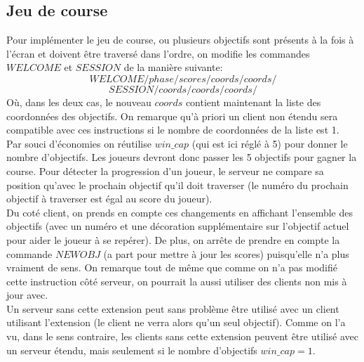 \documentclass{article}
\begin{document}
\subsection{Jeu de course}
Pour implémenter le jeu de course, ou plusieurs objectifs sont présents à la fois à l'écran et doivent être traversé dans l'ordre, on modifie les commandes $WELCOME$ et $SESSION$ de la manière suivante:
$$WELCOME/phase/scores/coords/coords/$$
$$SESSION/coords/coords/coords/$$
Où, dans les deux cas, le nouveau $coords$ contient maintenant la liste des coordonnées des objectifs. On remarque qu'à priori un client non étendu sera compatible avec ces instructions si le nombre de coordonnées de la liste est 1.\\
Par souci d'économies on réutilise $win\_cap$ (qui est ici réglé à 5) pour donner le nombre d'objectifs. Les joueurs devront donc passer les 5 objectifs pour gagner la course. Pour détecter la progression d'un joueur, le serveur ne compare sa position qu'avec le prochain objectif qu'il doit traverser (le numéro du prochain objectif à traverser est égal au score du joueur).\\
Du coté client, on prends en compte ces changements en affichant l'ensemble des objectifs (avec un numéro et une décoration supplémentaire sur l'objectif actuel pour aider le joueur à se repérer). De plus, on arrête de prendre en compte la commande $NEWOBJ$ (a part pour mettre à jour les scores) puisqu'elle n'a plus vraiment de sens. On remarque tout de même que comme on n'a pas modifié cette instruction côté serveur, on pourrait la aussi utiliser des clients non mis à jour avec.\\
Un serveur sans cette extension peut sans problème être utilisé avec un client utilisant l'extension (le client ne verra alors qu'un seul objectif). Comme on l'a vu, dans le sens contraire, les clients sans cette extension peuvent être utilisé avec un serveur étendu, mais seulement si le nombre d'objectifs $win\_cap = 1$.
\end{document}
